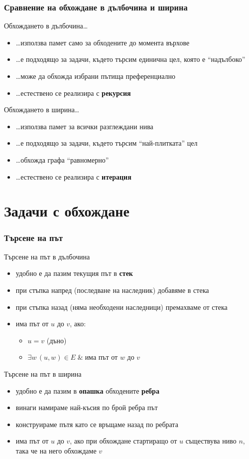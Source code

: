 \documentclass{beamer}
\begin{document}
\begin{frame}
  \frametitle{Сравнение на обхождане в дълбочина и ширина}
  Обхождането в дълбочина\ldots
  \pause
  \begin{itemize}[<+->]
  \item \ldots използва памет само за обходените до момента върхове
  \item \ldots е подходящо за задачи, където търсим единична цел, която е ``надълбоко''
  \item \ldots може да обхожда избрани пътища преференциално
  \item \ldots естествено се реализира с \textbf{рекурсия}
  \end{itemize}
  \onslide<+->
  Обхождането в ширина\ldots
  \begin{itemize}[<+->]
  \item \ldots използва памет за всички разглеждани нива
  \item \ldots е подходящо за задачи, където търсим ``най-плитката'' цел
  \item \ldots обхожда графа ``равномерно''
  \item \ldots естествено се реализира с \textbf{итерация}
  \end{itemize}
\end{frame}

\section{Задачи с обхождане}

\begin{frame}
  \frametitle{Търсене на път}
  Търсене на път в дълбочина
  \pause
  \begin{itemize}[<+->]
  \item удобно е да пазим текущия път в \textbf{стек}
  \item при стъпка напред (последване на наследник) добавяме в стека
  \item при стъпка назад (няма необходени наследници) премахваме от стека
  \item има път от $u$ до $v$, ако:
    \begin{itemize}
    \item $u = v$ (дъно)
    \item $\exists w\, (u,w)\in E\;\&\;$има път от $w$ до $v$
    \end{itemize}
  \end{itemize}
  \onslide<+->
  Търсене на път в ширина
  \begin{itemize}[<+->]
  \item удобно е да пазим в \textbf{опашка} обходените \textbf{ребра}
  \item винаги намираме най-късия по брой ребра път
  \item конструираме пътя като се връщаме назад по ребрата
  \item има път от $u$ до $v$, ако при обхождане стартиращо от $u$ съществува  ниво $n$, така че на него обхождаме $v$
  \end{itemize}
\end{frame}
\end{document}
